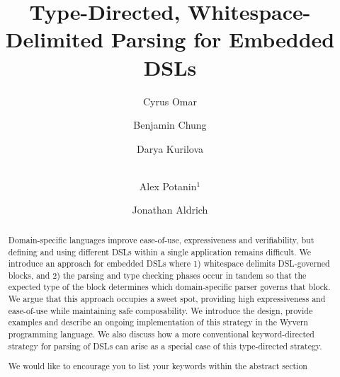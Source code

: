 \documentclass[runningheads,a4paper]{llncs}
\newcommand{\keywords}[1]{\par\addvspace\baselineskip
\noindent\keywordname\enspace\ignorespaces#1}
\begin{document}
\title{Type-Directed, Whitespace-Delimited Parsing for Embedded DSLs}

\author{Cyrus Omar \and Benjamin Chung \and Darya Kurilova \and\\
Alex Potanin$^{1}$ \and Jonathan Aldrich}

\maketitle


\begin{abstract}

Domain-specific languages improve ease-of-use, expressiveness and
verifiability, 
but defining and using different 
DSLs within a single application remains difficult.  
We introduce an approach for embedded DSLs where 1) whitespace delimits DSL-governed blocks, and 2) the parsing and type checking phases occur in tandem so that the expected type of the block determines which domain-specific parser governs that block.
We argue that this approach occupies a sweet spot, providing   
high expressiveness and ease-of-use while maintaining safe composability. We introduce the design, provide examples and describe an ongoing implementation of this strategy in the Wyvern programming language. We also discuss how a more conventional keyword-directed strategy for parsing of DSLs can arise as a special case of this type-directed strategy.

\keywords{We would like to encourage you to list your keywords within
the abstract section}
\end{abstract}












\end{document}
